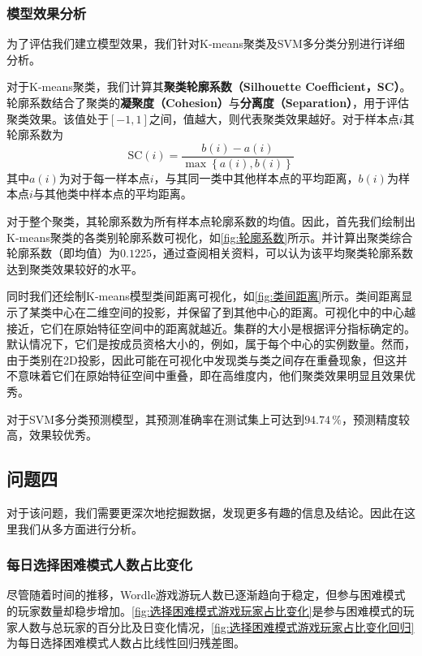 \documentclass{MathModeling}
\begin{document}
	\subsubsection{模型效果分析}
	为了评估我们建立模型效果，我们针对K-means聚类及SVM多分类分别进行详细分析。
	
	对于K-means聚类，我们计算其\textbf{聚类轮廓系数（Silhouette Coefficient，SC）}。轮廓系数结合了聚类的\textbf{凝聚度（Cohesion）}与\textbf{分离度（Separation）}，用于评估聚类效果。该值处于$\left[-1,1\right]$之间，值越大，则代表聚类效果越好。对于样本点$i$其轮廓系数为
	\begin{equation}
		\text{SC}\left(i\right)=\frac{b\left(i\right)-a\left(i\right)}{\max\left\{a\left(i\right),b\left(i\right)\right\}}
	\end{equation}
	其中$a\left(i\right)$为对于每一样本点$i$，与其同一类中其他样本点的平均距离，$b\left(i\right)$为样本点$i$与其他类中样本点的平均距离。
	
	对于整个聚类，其轮廓系数为所有样本点轮廓系数的均值。因此，首先我们绘制出K-means聚类的各类别轮廓系数可视化，如\textcolor{blue}{\cref{fig:轮廓系数}}所示。并计算出聚类综合轮廓系数（即均值）为$0.1225$，通过查阅相关资料\textcolor{blue}{\cite{k-means}}，可以认为该平均聚类轮廓系数达到聚类效果较好的水平。

	同时我们还绘制K-means模型类间距离可视化，如\textcolor{blue}{\cref{fig:类间距离}}所示。类间距离显示了某类中心在二维空间的投影，并保留了到其他中心的距离。可视化中的中心越接近，它们在原始特征空间中的距离就越近。集群的大小是根据评分指标确定的。默认情况下，它们是按成员资格大小的，例如，属于每个中心的实例数量\textcolor{blue}{\cite{类间距离}}。然而，由于类别在2D投影，因此可能在可视化中发现类与类之间存在重叠现象，但这并不意味着它们在原始特征空间中重叠，即在高维度内，他们聚类效果明显且效果优秀。

	对于SVM多分类预测模型，其预测准确率在测试集上可达到$94.74\,\%$，预测精度较高，效果较优秀。
	\subsection{问题四}\label{问题四}
	对于该问题，我们需要更深次地挖掘数据，发现更多有趣的信息及结论。因此在这里我们从多方面进行分析。
	\subsubsection{每日选择困难模式人数占比变化}
	尽管随着时间的推移，Wordle游戏游玩人数已逐渐趋向于稳定，但参与困难模式的玩家数量却稳步增加。\textcolor{blue}{\cref{fig:选择困难模式游戏玩家占比变化}}是参与困难模式的玩家人数与总玩家的百分比及日变化情况，\textcolor{blue}{\cref{fig:选择困难模式游戏玩家占比变化回归}}为每日选择困难模式人数占比线性回归残差图。
\end{document}
